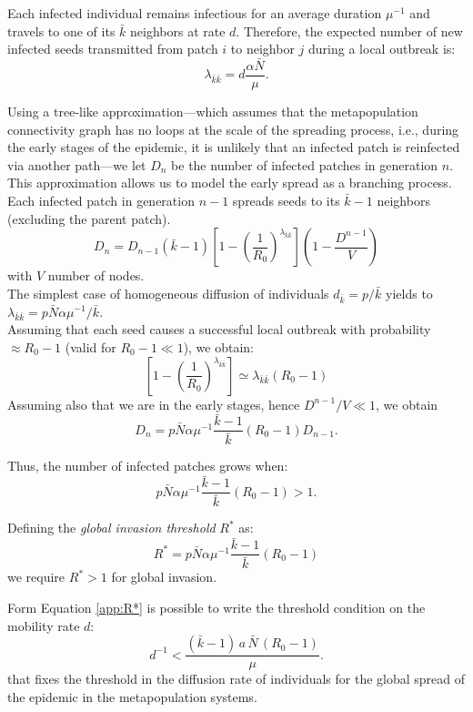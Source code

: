 Each infected individual remains infectious for an average duration \(\mu^{-1}\) and travels to one of its \(\bar{k}\) neighbors at rate \(d\). Therefore, the expected number of new infected seeds transmitted from patch \(i\) to neighbor \(j\) during a local outbreak is:
\[
\lambda_{\bar{k}\bar{k}} = d  \frac{\alpha\bar{N}}{\mu}.
\]

Using a tree-like approximation---which assumes that the metapopulation connectivity graph has no loops at the scale of the spreading process, i.e., during the early stages of the epidemic, it is unlikely that an infected patch is reinfected via another path---we let \(D_n\) be the number of infected patches in generation \(n\). This approximation allows us to model the early spread as a branching process. 
Each infected patch in generation \(n-1\) spreads seeds to its \(\bar{k} - 1\) neighbors (excluding the parent patch).
$$D_n=D_{n-1}(\bar{k}-1)\left[ 1-\left(\frac{1}{R_0}\right)^{\lambda_{\bar{k}\bar{k}}}\right]\left( 1-\frac{D^{n-1}}{V}\right)$$
with $V$ number of nodes. \\
The simplest case of homogeneous diffusion of individuals $d_{\bar{k}}=p/\bar{k}$ yields to $\lambda_{\bar{k}\bar{k}}=p\bar{N}\alpha\mu^{-1}/\bar{k}$. \\

 Assuming that each seed causes a successful local outbreak with probability \(\approx R_0 - 1\) (valid for \(R_0 -1 \ll 1\)), we obtain:
 \begin{equation}
     \left[ 1-\left(\frac{1}{R_0}\right)^{\lambda_{\bar{k}\bar{k}}}\right]\simeq \lambda_{\bar{k}\bar{k}}(R_0-1)
 \end{equation}
 Assuming also that we are in the early stages, hence $D^{n-1}/V \ll 1$, we obtain 
\begin{equation}
D_n = p\bar{N}\alpha\mu^{-1}\frac{\bar{k}-1}{\bar{k}}(R_0-1)D_{n-1}.
\end{equation}


Thus, the number of infected patches grows when:
\[
p\bar{N}\alpha\mu^{-1}\frac{\bar{k}-1}{\bar{k}}(R_0-1) > 1.
\]

Defining the \emph{global invasion threshold} \(R^*\) as:
\begin{equation}
\label{app:R*}
R^* = p\bar{N}\alpha\mu^{-1}\frac{\bar{k}-1}{\bar{k}}(R_0-1)
\end{equation}
we require \(R^* > 1\) for global invasion.

Form Equation \ref{app:R*} is possible to write the threshold condition on the mobility rate \(d\):
\[
d^{-1} < \frac{(\bar{k} - 1)\,a\,\bar{N}\,(R_0 - 1)}{\mu}.
\]
that fixes the threshold in the diffusion rate of individuals for the global spread of the epidemic in the metapopulation systems.

